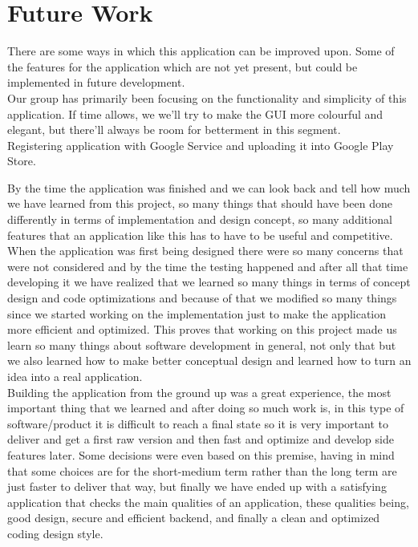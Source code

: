 \section{Future Work}

There are some ways in which this application can be improved upon. Some of the features for the application which are not yet present, but could be implemented in future development.\\

Our group has primarily been focusing on the functionality and simplicity of this application. If time allows, we we'll try to make the GUI more colourful and elegant, but there'll always be room for betterment in this segment.\\

Registering application with Google Service and uploading it into Google Play Store.

By the time the application was finished and we can look back and tell how much we have learned from this project, so many things that should have been done differently in terms of implementation and design concept, so many additional features that an application like this has to have to be useful and competitive. \\

When the application was first being designed there were so many concerns that were not considered and by the time the testing happened and after all that time developing it we have realized that we learned so many things in terms of concept design and code optimizations and because of that we modified so many things since we started working on the implementation just to make the application more efficient and optimized. This proves that working on this project made us learn so many things about software development in general, not only that but we also learned how to make better conceptual design and learned how to turn an idea into a real application.\\

Building the application from the ground up was a great experience, the most important thing that we learned and after doing so much work is, in this type of software/product it is difficult  to reach a final state so it is very important to deliver and get a first raw version and then fast and optimize and develop side features later. Some decisions were even based on this premise, having in mind that some choices are for the short-medium term rather than the long term are just faster to deliver that way, but finally we have ended up with a satisfying application that checks the main qualities of an application, these qualities being, good design, secure and efficient backend, and finally a clean and optimized coding design style.







